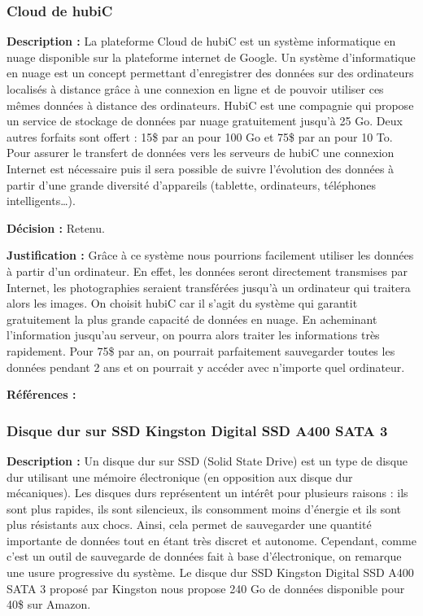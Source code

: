 \subsubsection{Cloud de hubiC}
\textbf{Description :} La plateforme Cloud de hubiC est un système informatique en nuage disponible sur la plateforme internet de Google. Un système d’informatique en nuage est un concept permettant d’enregistrer des données sur des ordinateurs localisés à distance grâce à une connexion en ligne et de pouvoir utiliser ces mêmes données à distance des ordinateurs. HubiC est une compagnie qui propose un service de stockage de données par nuage gratuitement jusqu’à 25 Go. Deux autres forfaits sont offert : 15\$ par an pour 100 Go et 75\$ par an pour 10 To. Pour assurer le transfert de données vers les serveurs de hubiC une connexion Internet est nécessaire puis il sera possible de suivre l’évolution des données à partir d’une grande diversité d’appareils (tablette, ordinateurs, téléphones intelligents…). 

\textbf{Décision :} Retenu.

\textbf{Justification :} Grâce à ce système nous pourrions facilement utiliser les données à partir d’un ordinateur. En effet, les données seront directement transmises par Internet, les photographies seraient transférées jusqu’à un ordinateur qui traitera alors les images. On choisit hubiC car il s’agit du système qui garantit gratuitement la plus grande capacité de données en nuage. En acheminant l’information jusqu’au serveur, on pourra alors traiter les informations très rapidement. Pour 75\$ par an, on pourrait parfaitement sauvegarder toutes les données pendant 2 ans et on pourrait y accéder avec n’importe quel ordinateur.

\textbf{Références :} \cite{hubic} \cite{clgo} \cite{incl}

\subsubsection{Disque dur sur SSD Kingston Digital SSD A400 SATA 3 }
\textbf{Description :} Un disque dur sur SSD (Solid State Drive) est un type de disque dur utilisant une mémoire électronique (en opposition aux disque dur mécaniques). Les disques durs représentent un intérêt pour plusieurs raisons : ils sont plus rapides, ils sont silencieux, ils consomment moins d’énergie et ils sont plus résistants aux chocs. Ainsi, cela permet de sauvegarder une quantité importante de données tout en étant très discret et autonome. Cependant, comme c’est un outil de sauvegarde de données fait à base d’électronique, on remarque une usure progressive du système. Le disque dur SSD Kingston Digital SSD A400 SATA 3 proposé par Kingston nous propose 240 Go de données disponible pour 40\$ sur Amazon. 

